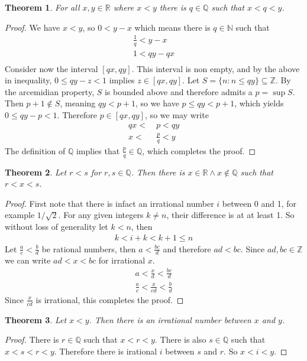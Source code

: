\documentclass{article}
\theoremstyle{plain}
\newtheorem{theorem}{Theorem}
\theoremstyle{definition}
\begin{document}
\begin{theorem}
	For all $x,y \in \mathbb{R}$ where $x < y$ there is $q \in \mathbb{Q}$ such
	that $x < q < y$.
\end{theorem}
\begin{proof}
	We have $x < y$, so $0 < y -x$ which means there is $q \in \mathbb{N}$ such
	that 
	\begin{align*}
		\frac{1}{q} < y -x \\
		1 < qy - qx \\
	\end{align*}
	Consider now the interval $[qx,qy]$. This interval is non empty, and by
	the above in inequality, $0 \leq qy-z<1$ implies $z \in [qx,qy]$. Let $S = 
	\{n:n \leq qy\} \subseteq \mathbb{Z}$. By the arcemidian property, $S$ is
	bounded above and therefore admits a $p = \sup S$. Then $p+1 \notin S$,
	meaning $qy < p+1$, so we have $p \leq qy < p+1$, which yields $0 \leq qy-p
	< 1$. Therefore $p\in [qx,qy]$, so we may write
	\begin{align*}
		qx <&\ p < qy \\
		x <&\ \frac{p}{q} < y
	\end{align*}
	The definition of $\mathbb{Q}$ implies that $\frac{p}{q} \in \mathbb{Q}$,
	which completes the proof.
\end{proof}
\begin{theorem}
	Let $r<s$ for $r,s \in \mathbb{Q}$. Then there is $x\in \mathbb{R} \land x
	\notin \mathbb{Q}$ such that $r<x<s$.
\end{theorem}
\begin{proof}
	First note that there is infact an irrational number $i$ between 0 and 1, 
	for example $1/\sqrt{2}$. For any given integers $k\neq n$, their
	difference is at at least 1. So without loss of generality let $k<n$, then
	\begin{align*}
		k < i+k < k+1 \leq n
	\end{align*}
	Let $\frac{a}{c}< \frac{b}{d}$ be rational numbers, then $a < \frac{bc}{d}$ 
	and therefore $ad < bc$. Since $ad,bc \in \mathbb{Z}$ we can write 
	$ad < x < bc$ for irrational $x$. 
	\begin{align*}
		a < \frac{x}{d} < \frac{bc}{d} \\
		\frac{a}{c} < \frac{x}{cd} < \frac{b}{d}
	\end{align*}
	Since $\frac{x}{cd}$ is irrational, this completes the proof.
\end{proof}
\begin{theorem}
	Let $x<y$. Then there is an irrational number between $x$ and $y$.
\end{theorem}
\begin{proof}
	There is $r \in \mathbb{Q}$ such that $x<r<y$. There is also $s\in
	\mathbb{Q}$ such that $x<s<r<y$. Therefore there is irational $i$ between
	$s$ and $r$. So $x<i<y$.
\end{proof}
\end{document}
